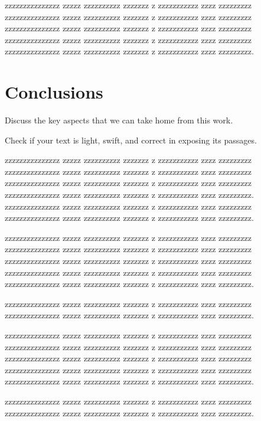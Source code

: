 \documentclass[prl,twocolumn]{revtex4-1}
\begin{document}
  zzzzzzzzzzzzzzz zzzzz zzzzzzzzzz zzzzzzz z zzzzzzzzzzz zzzz zzzzzzzzz
  zzzzzzzzzzzzzzz zzzzz zzzzzzzzzz zzzzzzz z zzzzzzzzzzz zzzz zzzzzzzzz
  zzzzzzzzzzzzzzz zzzzz zzzzzzzzzz zzzzzzz z zzzzzzzzzzz zzzz zzzzzzzzz
  zzzzzzzzzzzzzzz zzzzz zzzzzzzzzz zzzzzzz z zzzzzzzzzzz zzzz zzzzzzzzz
  zzzzzzzzzzzzzzz zzzzz zzzzzzzzzz zzzzzzz z zzzzzzzzzzz zzzz zzzzzzzzz.

\section{Conclusions}

Discuss the key aspects that we can take home from this work.

Check if your text is light, swift, and correct in exposing its passages.

  zzzzzzzzzzzzzzz zzzzz zzzzzzzzzz zzzzzzz z zzzzzzzzzzz zzzz zzzzzzzzz
  zzzzzzzzzzzzzzz zzzzz zzzzzzzzzz zzzzzzz z zzzzzzzzzzz zzzz zzzzzzzzz
  zzzzzzzzzzzzzzz zzzzz zzzzzzzzzz zzzzzzz z zzzzzzzzzzz zzzz zzzzzzzzz
  zzzzzzzzzzzzzzz zzzzz zzzzzzzzzz zzzzzzz z zzzzzzzzzzz zzzz zzzzzzzzz.
  zzzzzzzzzzzzzzz zzzzz zzzzzzzzzz zzzzzzz z zzzzzzzzzzz zzzz zzzzzzzzz
  zzzzzzzzzzzzzzz zzzzz zzzzzzzzzz zzzzzzz z zzzzzzzzzzz zzzz zzzzzzzzz.

  
  zzzzzzzzzzzzzzz zzzzz zzzzzzzzzz zzzzzzz z zzzzzzzzzzz zzzz zzzzzzzzz
  zzzzzzzzzzzzzzz zzzzz zzzzzzzzzz zzzzzzz z zzzzzzzzzzz zzzz zzzzzzzzz
  zzzzzzzzzzzzzzz zzzzz zzzzzzzzzz zzzzzzz z zzzzzzzzzzz zzzz zzzzzzzzz
  zzzzzzzzzzzzzzz zzzzz zzzzzzzzzz zzzzzzz z zzzzzzzzzzz zzzz zzzzzzzzz
  zzzzzzzzzzzzzzz zzzzz zzzzzzzzzz zzzzzzz z zzzzzzzzzzz zzzz zzzzzzzzz.
  
  zzzzzzzzzzzzzzz zzzzz zzzzzzzzzz zzzzzzz z zzzzzzzzzzz zzzz zzzzzzzzz
  zzzzzzzzzzzzzzz zzzzz zzzzzzzzzz zzzzzzz z zzzzzzzzzzz zzzz zzzzzzzzz.

  
  
  zzzzzzzzzzzzzzz zzzzz zzzzzzzzzz zzzzzzz z zzzzzzzzzzz zzzz zzzzzzzzz
  zzzzzzzzzzzzzzz zzzzz zzzzzzzzzz zzzzzzz z zzzzzzzzzzz zzzz zzzzzzzzz
  zzzzzzzzzzzzzzz zzzzz zzzzzzzzzz zzzzzzz z zzzzzzzzzzz zzzz zzzzzzzzz
  zzzzzzzzzzzzzzz zzzzz zzzzzzzzzz zzzzzzz z zzzzzzzzzzz zzzz zzzzzzzzz
  zzzzzzzzzzzzzzz zzzzz zzzzzzzzzz zzzzzzz z zzzzzzzzzzz zzzz zzzzzzzzz.
  
  zzzzzzzzzzzzzzz zzzzz zzzzzzzzzz zzzzzzz z zzzzzzzzzzz zzzz zzzzzzzzz
  zzzzzzzzzzzzzzz zzzzz zzzzzzzzzz zzzzzzz z zzzzzzzzzzz zzzz zzzzzzzzz.

  
\end{document}
